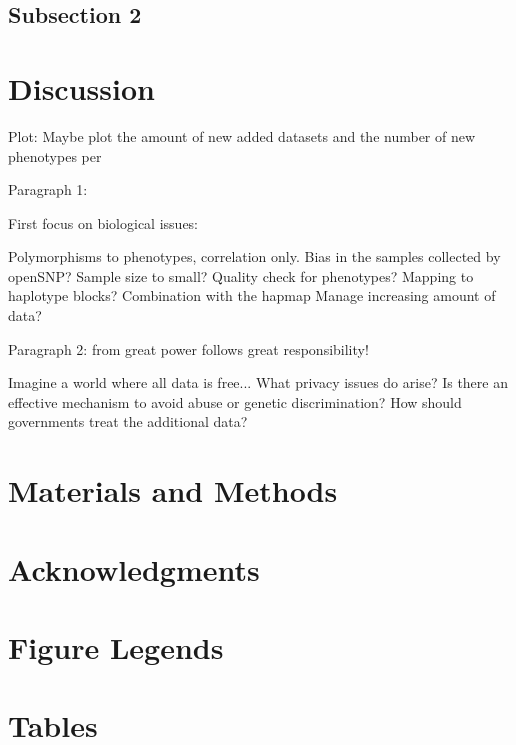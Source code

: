 \documentclass[10pt]{article}
\begin{document}
\subsection*{Subsection 2}

\section*{Discussion}


Plot: Maybe plot the amount of new added datasets and the number of new phenotypes per 

Paragraph 1:

First focus on biological issues:

Polymorphisms to phenotypes, correlation only.
Bias in the samples collected by openSNP?
Sample size to small?
Quality check for phenotypes?
Mapping to haplotype blocks?
Combination with the hapmap
Manage increasing amount of data?

Paragraph 2:
from great power follows great responsibility!

Imagine a world where all data is free...
What privacy issues do arise? 
Is there an effective mechanism to avoid abuse or
genetic discrimination?
How should governments treat the additional  data?


\section*{Materials and Methods}

\section*{Acknowledgments}




\section*{Figure Legends}


\section*{Tables}
\end{document}
